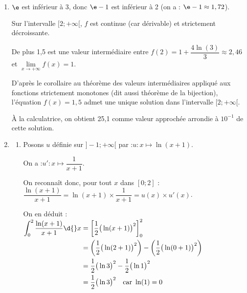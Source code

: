 \begin{enumerate}
		On a donc le tableau de variation complet de la fonction $f$ :

		\begin{center}
		\end{center}

		\item $\e$ est inférieur à 3, donc $\e - 1$ est inférieur à 2 (on a : $\e - 1 \approx 1,72$).

		Sur l'intervalle $[2 ; +\infty[$, $f$ est continue (car dérivable) et strictement décroissante.

		De plus 1,5 est une valeur intermédiaire entre \quad $f(2) = 1 + \dfrac{4\ln(3)}{3} \approx 2,46$ \quad et \quad$\lim\limits_{x \to +\infty} f(x) = 1$.

		D'après le corollaire au théorème des valeurs intermédiaires appliqué aux fonctions strictement monotones (dit aussi théorème de la bijection), l'équation \quad $f(x)=1,5$ \quad admet une unique solution dans l'intervalle $[2 ; +\infty[$.

		À la calculatrice, on obtient 25,1 comme valeur approchée arrondie à $10^{-1}$ de cette solution.

		\item \begin{enumerate}
			\item Posons $u$ définie sur $]-1 ; +\infty[$ par :\quad $u : x \longmapsto \ln(x+1)$.

			On a :\quad $u' : x \longmapsto \dfrac{1}{x+1}$.

			On reconnaît donc, pour tout $x$ dans $[0 ; 2]$ :\quad $\dfrac{\ln(x+1)}{x+1} = \ln(x+1) \times \dfrac{1}{x+1} = u(x) \times u'(x)$.

			On en déduit :
			$\begin{aligned}[t]
				\int_{0}^{2} \dfrac{\ln (x+1)}{x+1} \d{}x
					&= \left[\dfrac{1}{2}\big(\ln(x+1)\big)^2\right]_{0}^{2}\\
					&= \left(\dfrac{1}{2}\big(\ln(2+1)\big)^2\right) - \left(\dfrac{1}{2}\big(\ln(0+1)\big)^2\right)\\
					&= \dfrac{1}{2}\big(\ln 3\big)^{2} - \dfrac{1}{2}\big(\ln 1\big)^{2}\\
					&=\dfrac{1}{2}\big(\ln 3\big)^{2} \quad \text{car } \ln(1) = 0
			\end{aligned}$


\end{enumerate}
\end{enumerate}
